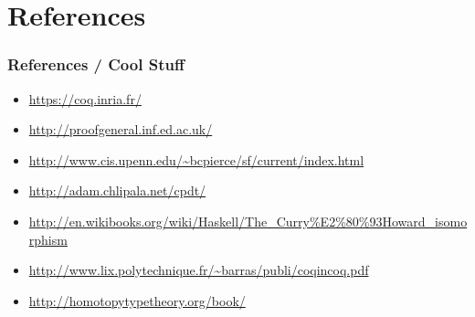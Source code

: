 \documentclass{beamer}
\begin{document}
\section{References}

\begin{frame}
  \frametitle{References / Cool Stuff}
  \begin{itemize}
  \item \url{https://coq.inria.fr/}
  \item \url{http://proofgeneral.inf.ed.ac.uk/}
  \item \url{http://www.cis.upenn.edu/~bcpierce/sf/current/index.html}
  \item \url{http://adam.chlipala.net/cpdt/}
  \item \url{http://en.wikibooks.org/wiki/Haskell/The_Curry\%E2\%80\%93Howard_isomorphism}
  \item \url{http://www.lix.polytechnique.fr/~barras/publi/coqincoq.pdf}
  \item \url{http://homotopytypetheory.org/book/}
  \end{itemize}
\end{frame}
\end{document}
